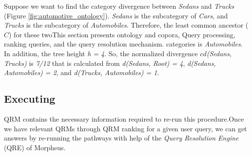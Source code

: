 Suppose we want to find the category divergence between \textit{Sedans}
and \textit{Trucks} (Figure \ref{fig:automotive_ontology}). 
\textit{Sedans} is the subcategory of \textit{Cars}, and \textit{Trucks}
is the subcategory of \textit{Automobiles}. Therefore, the least common ancestor ($C$)
for these twoThis section presents ontology and copora, Query processing, ranking queries, and the query resolution mechanism. categories is \textit{Automobiles}. In addition, the tree height \textit{h = 4}.
So, the normalized divergence $cd$\textit{(Sedans, Trucks)} is \textit{7/12}
that is calculated from \textit{d(Sedans, Root) = 4}, \textit{d(Sedans, Automobiles) = 2}, and \textit{d(Trucks, Automobiles) = 1}.


\subsection{Executing} 

QRM contains the necessary  
information required to re-run this procedure.Once we have 
relevant QRMs through QRM ranking for a given user query, we can  
get answers by re-running the pathways with help of 
the \emph{Query Resolution Engine} (QRE) of Morpheus. 

